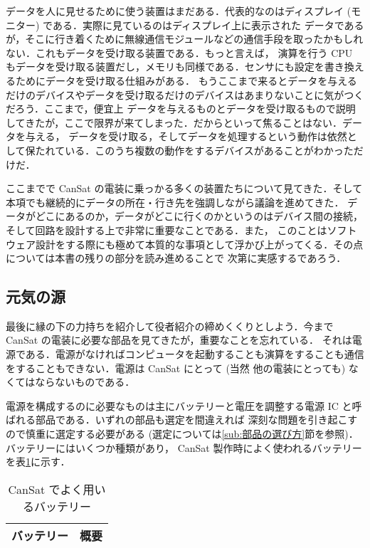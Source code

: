 \documentclass[dvipdfmx]{jsbook}
\begin{document}
  データを人に見せるために使う装置はまだある．代表的なのはディスプレイ (モニター) である．実際に見ているのはディスプレイ上に表示された
  データであるが，そこに行き着くために無線通信モジュールなどの通信手段を取ったかもしれない．これもデータを受け取る装置である．もっと言えば，
  演算を行う CPU もデータを受け取る装置だし，メモリも同様である．センサにも設定を書き換えるためにデータを受け取る仕組みがある．
  もうここまで来るとデータを与えるだけのデバイスやデータを受け取るだけのデバイスはあまりないことに気がつくだろう．ここまで，便宜上
  データを与えるものとデータを受け取るもので説明してきたが，ここで限界が来てしまった．だからといって焦ることはない．データを与える，
  データを受け取る，そしてデータを処理するという動作は依然として保たれている．このうち複数の動作をするデバイスがあることがわかっただけだ．

  ここまでで CanSat の電装に乗っかる多くの装置たちについて見てきた．そして本項でも継続的にデータの所在・行き先を強調しながら議論を進めてきた．
  データがどこにあるのか，データがどこに行くのかというのはデバイス間の接続，そして回路を設計する上で非常に重要なことである．また，
  このことはソフトウェア設計をする際にも極めて本質的な事項として浮かび上がってくる．その点については本書の残りの部分を読み進めることで
  次第に実感するであろう．

\subsection{元気の源}

  最後に縁の下の力持ちを紹介して役者紹介の締めくくりとしよう．今まで CanSat の電装に必要な部品を見てきたが，重要なことを忘れている．
  それは電源である．電源がなければコンピュータを起動することも演算をすることも通信をすることもできない．電源は CanSat にとって (当然
  他の電装にとっても) なくてはならないものである．

  電源を構成するのに必要なものは主にバッテリーと電圧を調整する電源 IC と呼ばれる部品である．いずれの部品も選定を間違えれば
  深刻な問題を引き起こすので慎重に選定する必要がある (選定については\ref{sub:部品の選び方}節を参照)．バッテリーにはいくつか種類があり，
  CanSat 製作時によく使われるバッテリーを表\ref{tab:2.2.4-battery}に示す．

  \begin{table}[htbp]
    \centering
    \caption{CanSat でよく用いるバッテリー}
    \begin{tabular}{c|r} \hline
      バッテリー & 概要 \\ \hline
    \end{tabular}
    \label{tab:2.2.4-battery}
  \end{table}
\end{document}

